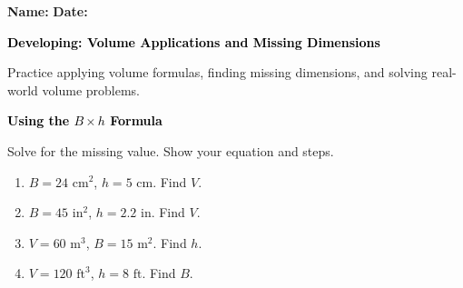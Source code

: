 \documentclass[12pt, letterpaper, fleqn]{article}
\begin{document}
\textbf{Name:} \underline{\hspace{5cm}}
\hfill
\textbf{Date:} \underline{\hspace{3cm}}\\

\begin{tcolorbox}[colback=black!10]
    \large\textcolor{black}{\textbf{Developing: Volume Applications and Missing Dimensions}}
\end{tcolorbox}

\vspace{3mm}

\noindent
Practice applying volume formulas, finding missing dimensions, and solving real-world volume problems.

\vspace{4mm}

\begin{tcolorbox}[colback=black!10]
\large\textcolor{black}{\textbf{Using the $B \times h$ Formula}}
\end{tcolorbox}

\noindent
Solve for the missing value. Show your equation and steps.

\vspace{3mm}

\begin{enumerate}[itemsep=1cm, leftmargin=0.6cm]

\item $B = 24\text{ cm}^2$, $h = 5\text{ cm}$. Find $V$.

\vspace{1.8cm}

\item $B = 45\text{ in}^2$, $h = 2.2\text{ in}$. Find $V$.

\vspace{1.8cm}

\item $V = 60\text{ m}^3$, $B = 15\text{ m}^2$. Find $h$.

\vspace{1.8cm}

\item $V = 120\text{ ft}^3$, $h = 8\text{ ft}$. Find $B$.

\vspace{1.8cm}

\end{enumerate}
\end{document}
